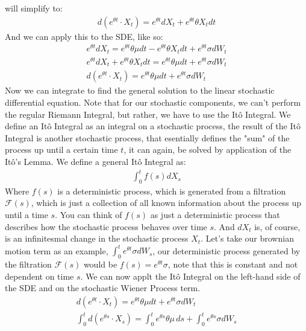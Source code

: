 \documentclass{article}
\begin{document}
\begin{spacing}{2.0}
will simplify to:
\begin{gather*}
    d\left ( e^{\theta t} \cdot X_{t} \right ) = e^{\theta t} dX_{t} + e^{\theta t} \theta X_{t} dt
\end{gather*}
And we can apply this to the SDE, like so:
\begin{gather*}
    e^{\theta t} dX_{t} = e^{\theta t} \theta \mu dt -  e^{\theta t} \theta X_{t} dt + e^{\theta t} \sigma dW_{t} \\
    e^{\theta t} dX_{t} + e^{\theta t} \theta X_{t} dt = e^{\theta t} \theta \mu dt + e^{\theta t} \sigma dW_{t} \\
    d\left ( e^{\theta t} \cdot X_{t} \right ) = e^{\theta t} \theta \mu dt + e^{\theta t} \sigma dW_{t}
\end{gather*}
Now we can integrate to find the general solution to the linear stochastic differential equation. Note that for our stochastic components, we can't perform the regular
Riemann Integral, but rather, we have to use the Itô Integral. We define an Itô Integral as an integral on a stochastic process, the result of the Itô Integral is another
stochastic process, that esentially defines the "sum" of the process up until a certain time $t$, it can again, be solved by application of the Itô's Lemma. We define a general
Itô Integral as:
\begin{gather*}
    \int_{0}^{t} f(s) dX_{s}
\end{gather*}
Where $f(s)$ is a deterministic process, which is generated from a filtration $\mathcal{F}(s)$, which is just a collection of all known information about the process up until a time
$s$. You can think of $f(s)$ as just a deterministic process that describes how the stochastic process behaves over time $s$. And $dX_{t}$ is, of course, is an infinitesmal change in
the stochastic process $X_{t}$. Let's take our brownian motion term as an example, $\int_{0}^{t} e^{\theta t} \sigma dW_{s}$, our deterministic process generated by the filtration
$\mathcal{F}(s)$ would be $f(s) = e^{\theta t} \sigma$, note that this is constant and not dependent on time $s$. We can now applt the Itô Integral on the left-hand side of the SDE
and on the stochastic Wiener Process term.
\begin{gather*}
    d\left ( e^{\theta t} \cdot X_{t} \right ) = e^{\theta t} \theta \mu dt + e^{\theta t} \sigma dW_{t} \\
    \int_{0}^{t} d\left ( e^{\theta s} \cdot X_{s} \right ) = \int_{0}^{t} e^{\theta s} \theta \mu \, ds + \int_{0}^{t} e^{\theta s} \sigma dW_{s}
\end{gather*}

\end{spacing}
\end{document}
